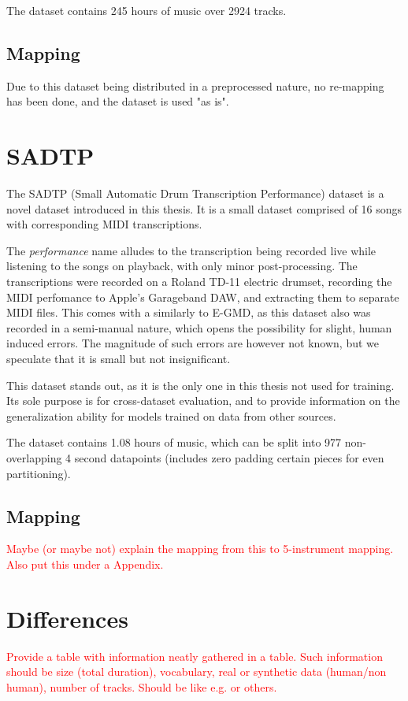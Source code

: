 The dataset contains 245 hours of music over 2924 tracks.

\subsection{Mapping}

Due to this dataset being distributed in a preprocessed nature, no re-mapping has been done, and the dataset is used "as is".

\section{SADTP}

The SADTP (Small Automatic Drum Transcription Performance) dataset is a novel dataset introduced in this thesis. It is a small dataset comprised of 16 songs with corresponding MIDI transcriptions. 

The \textit{performance} name alludes to the transcription being recorded live while listening to the songs on playback, with only minor post-processing. The transcriptions were recorded on a Roland TD-11 electric drumset, recording the MIDI perfomance to Apple's Garageband \gls{DAW}, and extracting them to separate MIDI files. This comes with a similarly to E-GMD, as this dataset also was recorded in a semi-manual nature, which opens the possibility for slight, human induced errors. The magnitude of such errors are however not known, but we speculate that it is small but not insignificant.

This dataset stands out, as it is the only one in this thesis not used for training. Its sole purpose is for cross-dataset evaluation, and to provide information on the generalization ability for models trained on data from other sources.

The dataset contains 1.08 hours of music, which can be split into 977 non-overlapping 4 second datapoints (includes zero padding certain pieces for even partitioning).

\subsection{Mapping}

\textcolor{red}{Maybe (or maybe not) explain the mapping from this to 5-instrument mapping. Also put this under a Appendix.}

\section{Differences}

\textcolor{red}{Provide a table with information neatly gathered in a table. Such information should be size (total duration), vocabulary, real or synthetic data (human/non human), number of tracks. Should be like e.g. \cite{signals4040042,callender2020improvingperceptualqualitydrum} or others.}